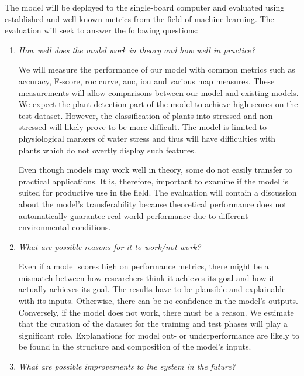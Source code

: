 \documentclass[draft,final]{vutinfth} %
\begin{document}
The model will be deployed to the single-board computer and evaluated
using established and well-known metrics from the field of machine
learning. The evaluation will seek to answer the following questions:

\begin{enumerate}
\item \emph{How well does the model work in theory and how well in
    practice?}

  We will measure the performance of our model with common metrics
  such as accuracy, F-score, \gls{roc} curve, \gls{auc}, \gls{iou} and
  various \gls{map} measures. These measurements will allow
  comparisons between our model and existing models. We expect the
  plant detection part of the model to achieve high scores on the test
  dataset. However, the classification of plants into stressed and
  non-stressed will likely prove to be more difficult. The model is
  limited to physiological markers of water stress and thus will have
  difficulties with plants which do not overtly display such features.

  Even though models may work well in theory, some do not easily
  transfer to practical applications. It is, therefore, important to
  examine if the model is suited for productive use in the field. The
  evaluation will contain a discussion about the model's
  transferability because theoretical performance does not
  automatically guarantee real-world performance due to different
  environmental conditions.
\item \emph{What are possible reasons for it to work/not work?}

  Even if a model scores high on performance metrics, there might be a
  mismatch between how researchers think it achieves its goal and how
  it actually achieves its goal. The results have to be plausible and
  explainable with its inputs. Otherwise, there can be no confidence
  in the model's outputs. Conversely, if the model does not work,
  there must be a reason. We estimate that the curation of the dataset
  for the training and test phases will play a significant
  role. Explanations for model out- or underperformance are likely to
  be found in the structure and composition of the model's inputs.
\item \emph{What are possible improvements to the system in the
    future?}


\end{enumerate}
\end{document}

